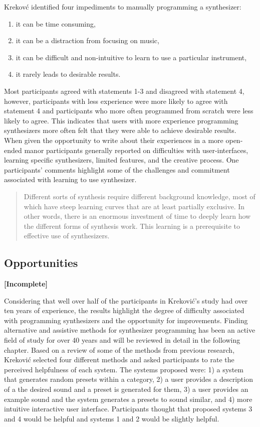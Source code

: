 Krekov\'{c} identified four impediments to manually programming a synthesizer:
\begin{enumerate}
    \item it can be time consuming,
    \item it can be a distraction from focusing on music,
    \item it can be difficult and non-intuitive to learn to use a particular instrument,
    \item it rarely leads to desirable results.
\end{enumerate}

Most participants agreed with statements 1-3 and disagreed with statement 4, however, participants with less experience were more likely to agree with statement 4 and participants who more often programmed from scratch were less likely to agree. This indicates that users with more experience programming synthesizers more often felt that they were able to achieve desirable results. When given the opportunity to write about their experiences in a more open-ended manor participants generally reported on difficulties with user-interfaces, learning specific synthesizers, limited features, and the creative process. One participants' comments highlight some of the challenges and commitment associated with learning to use synthesizer.

\begin{quote}
    Different sorts of synthesis require different background knowledge, most of which have steep learning curves that are at least partially exclusive. In other words, there is an enormous investment of time to deeply learn how the different forms of synthesis work. This learning is a prerequisite to effective use of synthesizers.
\end{quote}

\subsection{Opportunities}
\textbf{[Incomplete]}

Considering that well over half of the participants in Krekovi\'{c}'s study had over ten years of experience, the results highlight the degree of difficulty associated with programming synthesizers and the opportunity for improvements. Finding alternative and assistive methods for synthesizer programming has been an active field of study for over 40 years and will be reviewed in detail in the following chapter. Based on a review of some of the methods from previous research, Krekovi\'{c} selected four different methods and asked participants to rate the perceived helpfulness of each system. The systems proposed were: 1) a system that generates random presets within a category, 2) a user provides a description of a the desired sound and a preset is generated for them, 3) a user provides an example sound and the system generates a presets to sound similar, and 4) more intuitive interactive user interface. Participants thought that proposed systems 3 and 4 would be helpful and systems 1 and 2 would be slightly helpful. 

